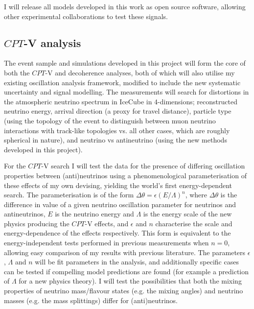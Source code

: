 \documentclass[a4paper,11pt]{article}
\begin{document}
I will release all models developed in this work as open source software, allowing other experimental collaborations to test these signals.  \\


\subsection{$CPT$-V analysis}

The event sample and simulations developed in this project will form the core of both the $CPT$-V and decoherence analyses, both of which will also utilise my existing oscillation analysis framework, modified to include the new systematic uncertainty and signal modelling. The measurements will search for distortions in the atmospheric neutrino spectrum in IceCube in 4-dimensions; reconstructed neutrino energy, arrival direction (a proxy for travel distance), particle type (using the topology of the event to distinguish between muon neutrino interactions with track-like topologies vs. all other cases, which are roughly spherical in nature), and neutrino vs antineutrino (using the new methods developed in this project).

For the $CPT$-V search I will test the data for the presence of differing oscillation properties between (anti)neutrinos using a phenomenological parameterisation of these effects of my own devising, yielding the world's first energy-dependent search. The parameterisation is of the form $\Delta \theta = \epsilon (E/\Lambda)^n$, where $\Delta \theta$ is the difference in value of a given neutrino oscillation parameter for neutrinos and antineutrinos, $E$ is the neutrino energy and $\Lambda$ is the energy scale of the new physics producing the $CPT$-V effects, and $\epsilon$ and $n$ characterise the scale and energy-dependence of the effects respectively. This form is equivalent to the energy-independent tests performed in previous measurements when $n=0$, allowing easy comparison of my results with previous literature. The parameters $\epsilon$, $\Lambda$ and $n$ will be fit parameters in the analysis, and additionally specific cases can be tested if compelling model predictions are found (for example a prediction of $\Lambda$ for a new physics theory). I will test the possibilities that both the mixing properties of neutrino mass/flavour states (e.g. the mixing angles) and neutrino masses (e.g. the mass splittings) differ for (anti)neutrinos. 
\end{document}
